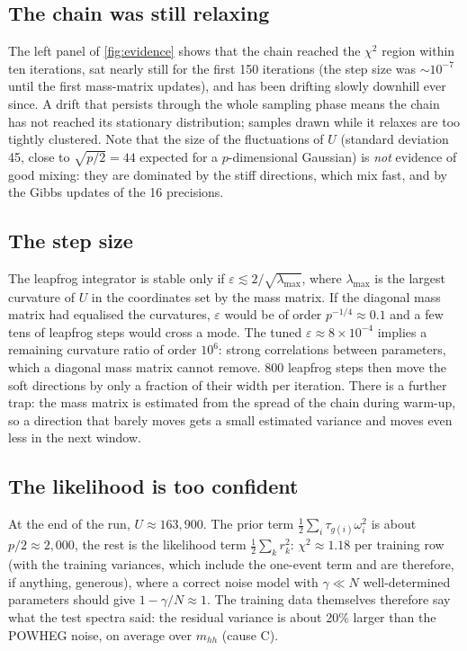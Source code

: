 \subsection{The chain was still relaxing}

The left panel of \cref{fig:evidence} shows that the chain reached the $\chi^2$ region
within ten iterations, sat nearly still for the first 150 iterations (the step size was
$\sim\!10^{-7}$ until the first mass-matrix updates), and has been drifting slowly
downhill ever since. A drift that persists through the whole sampling phase means the chain
has not reached its stationary distribution; samples drawn while it relaxes are too tightly
clustered. Note that the size of the fluctuations of $U$ (standard deviation 45, close to
$\sqrt{p/2} = 44$ expected for a $p$-dimensional Gaussian) is \emph{not} evidence of
good mixing: they are dominated by the stiff directions, which mix fast, and by the Gibbs
updates of the 16 precisions.

\subsection{The step size}

The leapfrog integrator is stable only if $\varepsilon \lesssim 2/\sqrt{\lambda_\text{max}}$,
where $\lambda_\text{max}$ is the largest curvature of $U$ in the coordinates set by the
mass matrix. If the diagonal mass matrix had equalised the curvatures, $\varepsilon$ would
be of order $p^{-1/4} \approx 0.1$ and a few tens of leapfrog steps would cross a mode. The
tuned $\varepsilon \approx 8\times10^{-4}$ implies a remaining curvature ratio of order
$10^6$: strong correlations between parameters, which a diagonal mass matrix cannot remove.
800 leapfrog steps then move the soft directions by only a fraction of their width per
iteration. There is a further trap: the mass matrix is estimated from the spread of the
chain during warm-up, so a direction that barely moves gets a small estimated variance and
moves even less in the next window.

\subsection{The likelihood is too confident}

At the end of the run, $U \approx 163{,}900$. The prior term
$\tfrac12\sum_i\tau_{g(i)}\omega_i^2$ is about $p/2 \approx 2{,}000$, the rest is the
likelihood term $\tfrac12\sum_k r_k^2$: $\chi^2 \approx 1.18$ per training row (with the
training variances, which include the one-event term and are therefore, if anything,
generous), where a correct
noise model with $\gamma \ll N$ well-determined parameters should give $1 - \gamma/N
\approx 1$. The training data themselves therefore say what the test spectra said: the
residual variance is about 20\% larger than the POWHEG noise, on average over $m_{hh}$
(cause C).

